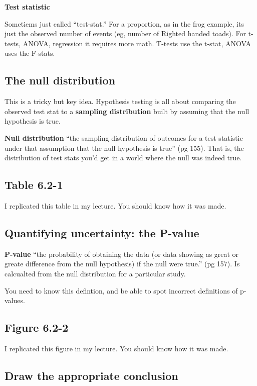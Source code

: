 \documentclass[]{book}
\theoremstyle{definition}
\theoremstyle{definition}
\theoremstyle{definition}
\theoremstyle{remark}
\begin{document}
\textbf{Test statistic}

Sometiems just called ``test-stat.'' For a proportion, as in the frog
example, its just the observed number of events (eg, number of Righted
handed toads). For t-tests, ANOVA, regression it requires more math.
T-tests use the t-stat, ANOVA uses the F-stats.

\subsection{The null distribution}\label{the-null-distribution}

This is a tricky but key idea. Hypothesis testing is all about comparing
the observed test stat to a \textbf{sampling distribution} built by
assuming that the null hypothesis is true.

\textbf{Null distribution} ``the sampling distribution of outcomes for a
test statistic under that assumption that the null hypothesis is true''
(pg 155). That is, the distribution of test stats you'd get in a world
where the null was indeed true.

\subsection{Table 6.2-1}\label{table-6.2-1}

I replicated this table in my lecture. You should know how it was made.

\subsection{Quantifying uncertainty: the
P-value}\label{quantifying-uncertainty-the-p-value}

\textbf{P-value} ``the probability of obtaining the data (or data
showing as great or greate difference from the null hypothesis) if the
null were true.'' (pg 157). Is calcualted from the null distribution for
a particular study.

You need to know this defintion, and be able to spot incorrect
definitions of p-values.

\subsection{Figure 6.2-2}\label{figure-6.2-2}

I replicated this figure in my lecture. You should know how it was made.

\subsection{Draw the appropriate
conclusion}\label{draw-the-appropriate-conclusion}
\end{document}

